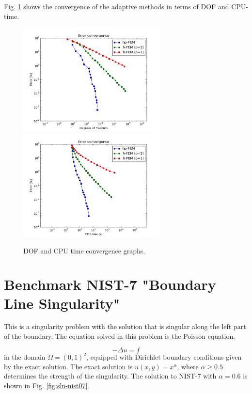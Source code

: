 \documentclass[12pt]{elsarticle}
\begin{document}
Fig. \ref{fig:nist-6-conv} shows the convergence of the adaptive methods in terms of DOF and CPU-time.

\begin{figure}[H]
\centering
\vspace{-2mm}
\hspace{-50mm}
\includegraphics[width=7.5cm]{nist/nist-6/conv_dof_aniso.png}\ \
\hspace{-10mm}
\includegraphics[width=7.5cm]{nist/nist-6/conv_cpu_aniso.png}
\hspace{-50mm}
\caption{DOF and CPU time convergence graphs.}
\vspace{-2mm}
\label{fig:nist-6-conv}
\end{figure}


\section{Benchmark NIST-7 "Boundary Line Singularity"}
\label{sec:bench-7}

This is a singularity problem with the solution that is singular along the left part of the boundary.
The equation solved in this problem is the Poisson equation.

\begin{equation} \label{boundary-line-singularity}
-\Delta u = f
\end{equation}
in the domain $\Omega = (0, 1)^2$, equipped with Dirichlet boundary conditions
given by the exact solution. The exact solution is
$u(x,y) = x^{\alpha}$,
where $\alpha \geq 0.5$ determines the strength of the singularity.
The solution to NIST-7 with $\alpha = 0.6$ is shown in Fig. \ref{fig:sln-nist07}.
\end{document}
